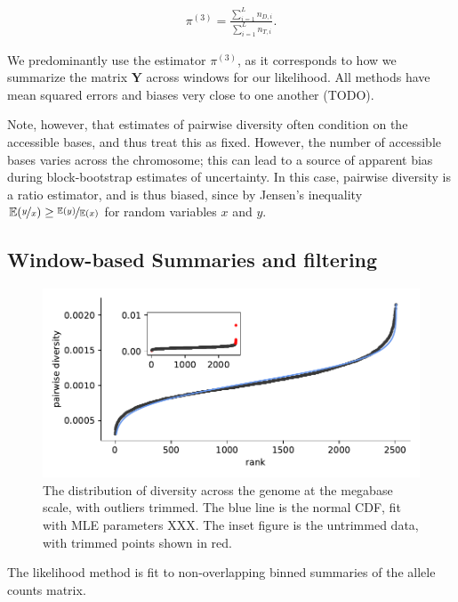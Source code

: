 \documentclass[11pt]{article}
\newcommand{\E}{\mathbb{E}}
\begin{document}
\begin{align}
  \label{eq:}
  \pi^{(3)} = \frac{\sum_{i=1}^L n_{D,i}}{\sum_{i=1}^L n_{T,i}}.
\end{align}

We predominantly use the estimator $\pi^{(3)}$, as it corresponds to how we
summarize the matrix $\mathbf{Y}$ across windows for our likelihood. All
methods have mean squared errors and biases very close to one another (TODO).

Note, however, that estimates of pairwise diversity often condition on the
accessible bases, and thus treat this as fixed. However, the number of
accessible bases varies across the chromosome; this can lead to a source of
apparent bias during block-bootstrap estimates of uncertainty.  In this case,
pairwise diversity is a ratio estimator, and is thus biased, since by Jensen's
inequality $\E(\nicefrac{y}{x}) \ge \nicefrac{\E(y)}{\E(x)}$ for random
variables $x$ and $y$. 

\subsection{Window-based Summaries and filtering}

\begin{figure}[!htb]
  \centering
  \includegraphics{figures/supplementary/diversity_trimming_dist.pdf}

  \caption{The distribution of diversity across the genome at the megabase
  scale, with outliers trimmed. The blue line is the normal CDF, fit with MLE
parameters XXX. The inset figure is the untrimmed data, with trimmed points
shown in red.}

  \label{suppfig:trimming}
\end{figure}



The likelihood method is fit to non-overlapping binned summaries of the allele
counts matrix. 
\end{document}
